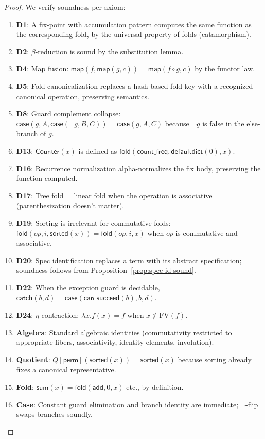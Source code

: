 \documentclass[11pt,a4paper]{report}
\theoremstyle{definition}
\theoremstyle{plain}
\newcommand{\fold}{\mathsf{fold}}
\begin{document}
\begin{proof}
We verify soundness per axiom:
\begin{enumerate}
  \item \textbf{D1}: A fix-point with accumulation pattern computes
    the same function as the corresponding fold, by the universal
    property of folds (catamorphism).
  \item \textbf{D2}: $\beta$-reduction is sound by the substitution
    lemma.
  \item \textbf{D4}: Map fusion: $\mathsf{map}(f, \mathsf{map}(g, c))
    = \mathsf{map}(f \circ g, c)$ by the functor law.
  \item \textbf{D5}: Fold canonicalization replaces a hash-based fold
    key with a recognized canonical operation, preserving semantics.
  \item \textbf{D8}: Guard complement collapse:
    $\mathsf{case}(g, A, \mathsf{case}(\lnot g, B, C))
    = \mathsf{case}(g, A, C)$ because $\lnot g$ is false in the
    else-branch of $g$.
  \item \textbf{D13}: $\mathsf{Counter}(x)$ is defined as
    $\fold(\mathsf{count\_freq}, \mathsf{defaultdict}(0), x)$.
  \item \textbf{D16}: Recurrence normalization alpha-normalizes the
    fix body, preserving the function computed.
  \item \textbf{D17}: Tree fold = linear fold when the operation is
    associative (parenthesization doesn't matter).
  \item \textbf{D19}: Sorting is irrelevant for commutative folds:
    $\fold(\mathit{op}, i, \mathsf{sorted}(x))
    = \fold(\mathit{op}, i, x)$ when $\mathit{op}$ is commutative
    and associative.
  \item \textbf{D20}: Spec identification replaces a term with its
    abstract specification; soundness follows from
    Proposition~\ref{prop:spec-id-sound}.
  \item \textbf{D22}: When the exception guard is decidable,
    $\mathsf{catch}(b, d) = \mathsf{case}(\mathsf{can\_succeed}(b), b, d)$.
  \item \textbf{D24}: $\eta$-contraction:
    $\lambda x.f(x) = f$ when $x \notin \mathrm{FV}(f)$.
  \item \textbf{Algebra}: Standard algebraic identities
    (commutativity restricted to appropriate fibers,
    associativity, identity elements, involution).
  \item \textbf{Quotient}: $Q[\mathsf{perm}](\mathsf{sorted}(x))
    = \mathsf{sorted}(x)$ because sorting already fixes a
    canonical representative.
  \item \textbf{Fold}: $\mathsf{sum}(x) = \fold(\mathsf{add}, 0, x)$
    etc., by definition.
  \item \textbf{Case}: Constant guard elimination and branch
    identity are immediate; $\lnot$-flip swaps branches soundly.
\end{enumerate}
\end{proof}
\end{document}
